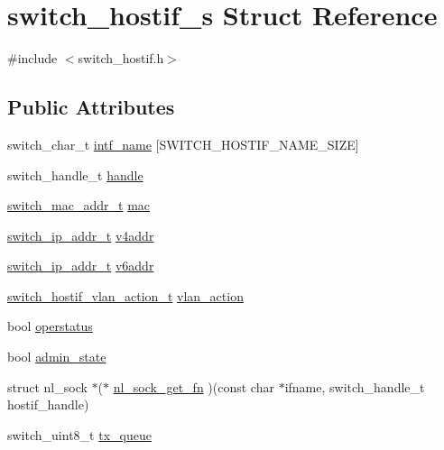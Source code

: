 \hypertarget{structswitch__hostif__s}{\section{switch\+\_\+hostif\+\_\+s Struct Reference}
\label{structswitch__hostif__s}
}


{\ttfamily \#include $<$switch\+\_\+hostif.\+h$>$}

\subsection*{Public Attributes}
\begin{DoxyCompactItemize}
\item 
switch\+\_\+char\+\_\+t \hyperlink{structswitch__hostif__s_a6abf2c4fa1e9b2d265bab4ee6cc99518}{intf\+\_\+name} \mbox{[}S\+W\+I\+T\+C\+H\+\_\+\+H\+O\+S\+T\+I\+F\+\_\+\+N\+A\+M\+E\+\_\+\+S\+I\+Z\+E\mbox{]}
\item 
switch\+\_\+handle\+\_\+t \hyperlink{structswitch__hostif__s_ac489a29fc7f506ec2dc9b80db51314cb}{handle}
\item 
\hyperlink{structswitch__mac__addr__s}{switch\+\_\+mac\+\_\+addr\+\_\+t} \hyperlink{structswitch__hostif__s_a88e9c77b0f1e2909f1be989ab2e23e8a}{mac}
\item 
\hyperlink{structswitch__ip__addr__s}{switch\+\_\+ip\+\_\+addr\+\_\+t} \hyperlink{structswitch__hostif__s_a5eb00b5b5f6387f8552ca9a0dded1396}{v4addr}
\item 
\hyperlink{structswitch__ip__addr__s}{switch\+\_\+ip\+\_\+addr\+\_\+t} \hyperlink{structswitch__hostif__s_ac6b227eeabbc17456154b14ab3644bb7}{v6addr}
\item 
\hyperlink{group__HostInterface_ga941337bc8e6d3df44983db93d6000a15}{switch\+\_\+hostif\+\_\+vlan\+\_\+action\+\_\+t} \hyperlink{structswitch__hostif__s_a963a45b780889ea85ae87e15b002281b}{vlan\+\_\+action}
\item 
bool \hyperlink{structswitch__hostif__s_afabebfb4866c63154390d1dbedca20db}{operstatus}
\item 
bool \hyperlink{structswitch__hostif__s_a3445a3283b1c3e9fea8082e18db4ebcb}{admin\+\_\+state}
\item 
struct nl\+\_\+sock $\ast$($\ast$ \hyperlink{structswitch__hostif__s_a09a5dead93b027e3583d78bc0ba1a80d}{nl\+\_\+sock\+\_\+get\+\_\+fn} )(const char $\ast$ifname, switch\+\_\+handle\+\_\+t hostif\+\_\+handle)
\item 
switch\+\_\+uint8\+\_\+t \hyperlink{structswitch__hostif__s_ae8f584528b5189e3770c8788868bc585}{tx\+\_\+queue}
\end{DoxyCompactItemize}


